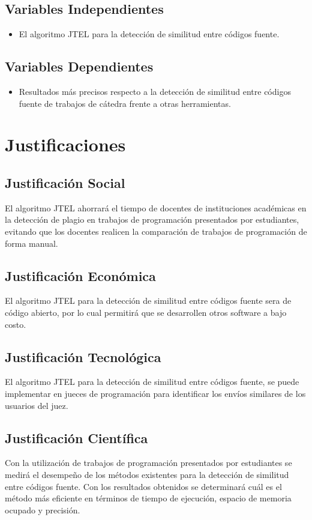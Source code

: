 \subsection{Variables Independientes}
\begin{itemize}
    \item El algoritmo JTEL para la detección de similitud entre códigos fuente.
\end{itemize}
\subsection{Variables Dependientes}
\begin{itemize}
    \item Resultados más precisos respecto a la detección de similitud entre códigos fuente de trabajos de cátedra frente a otras herramientas.
\end{itemize}
\section{Justificaciones}
\subsection{Justificación Social}
El algoritmo JTEL ahorrará el tiempo de docentes de instituciones académicas en la detección de plagio en trabajos de programación presentados por estudiantes, evitando que los docentes realicen la comparación de trabajos de programación de forma manual.
\subsection{Justificación Económica}
El algoritmo JTEL para la detección de similitud entre códigos fuente sera de código abierto, por lo cual permitirá que se desarrollen otros software a bajo costo.
\subsection{Justificación Tecnológica}
El algoritmo JTEL para la detección de similitud entre códigos fuente, se puede implementar en jueces de programación para identificar los envíos similares de los usuarios del juez.
\subsection{Justificación Científica}
Con la utilización de trabajos de programación presentados por estudiantes se medirá el desempeño de los métodos existentes para la detección de similitud entre códigos fuente. Con los resultados obtenidos se determinará cuál es el método más eficiente en términos de tiempo de ejecución, espacio de memoria ocupado y precisión.
